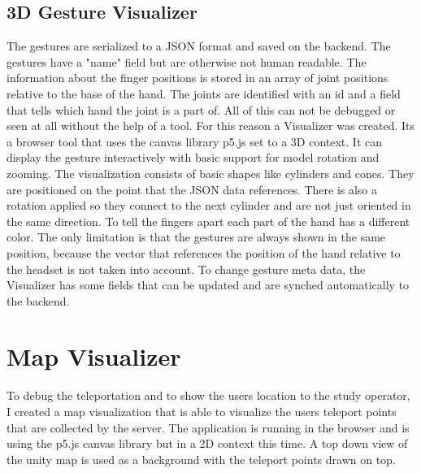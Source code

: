\subsection{3D Gesture Visualizer}
The gestures are serialized to a JSON format and saved on the backend. The gestures have a "name" field but are otherwise not human readable. The information about the finger positions is stored in an array of joint positions relative to the base of the hand. The joints are identified with an id and a field that tells which hand the joint is a part of. All of this can not be debugged or seen at all without the help of a tool. For this reason a Visualizer was created. Its a browser tool that uses the canvas library p5.js set to a 3D context. It can display the gesture interactively with basic support for model rotation and zooming. The visualization consists of basic shapes like cylinders and cones. They are positioned on the point that the JSON data references. There is also a rotation applied so they connect to the next cylinder and are not just oriented in the same direction. To tell the fingers apart each part of the hand has a different color. The only limitation is that the gestures are always shown in the same position, because the vector that references the position of the hand relative to the headset is not taken into account. To change gesture meta data, the Visualizer has some fields that can be updated and are synched automatically to the backend.


\section{Map Visualizer}
To debug the teleportation and to show the users location to the study operator, I created a map visualization that is able to visualize the users teleport points that are collected by the server. The application is running in the browser and is using the p5.js canvas library but in a 2D context this time. A top down view of the unity map is used as a background with the teleport points drawn on top.
